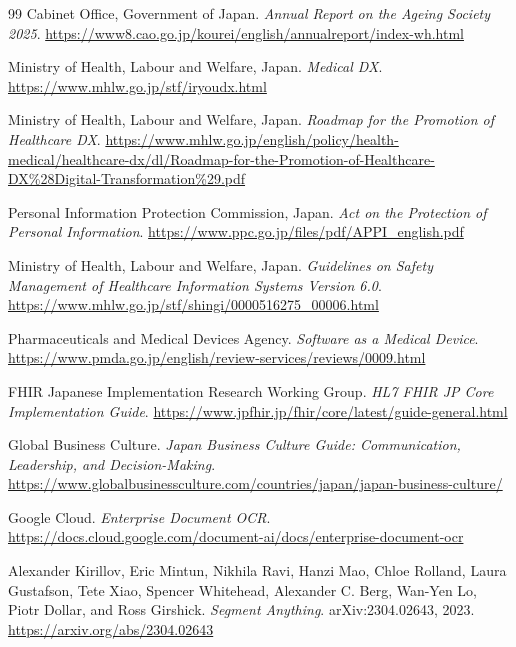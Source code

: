 \begin{thebibliography}{99}
Cabinet Office, Government of Japan.
\newblock \textit{Annual Report on the Ageing Society 2025}.
\newblock \url{https://www8.cao.go.jp/kourei/english/annualreport/index-wh.html}

Ministry of Health, Labour and Welfare, Japan.
\newblock \textit{Medical DX}.
\newblock \url{https://www.mhlw.go.jp/stf/iryoudx.html}

Ministry of Health, Labour and Welfare, Japan.
\newblock \textit{Roadmap for the Promotion of Healthcare DX}.
\newblock \url{https://www.mhlw.go.jp/english/policy/health-medical/healthcare-dx/dl/Roadmap-for-the-Promotion-of-Healthcare-DX%28Digital-Transformation%29.pdf}

Personal Information Protection Commission, Japan.
\newblock \textit{Act on the Protection of Personal Information}.
\newblock \url{https://www.ppc.go.jp/files/pdf/APPI_english.pdf}

Ministry of Health, Labour and Welfare, Japan.
\newblock \textit{Guidelines on Safety Management of Healthcare Information Systems Version 6.0}.
\newblock \url{https://www.mhlw.go.jp/stf/shingi/0000516275_00006.html}

Pharmaceuticals and Medical Devices Agency.
\newblock \textit{Software as a Medical Device}.
\newblock \url{https://www.pmda.go.jp/english/review-services/reviews/0009.html}

FHIR Japanese Implementation Research Working Group.
\newblock \textit{HL7 FHIR JP Core Implementation Guide}.
\newblock \url{https://www.jpfhir.jp/fhir/core/latest/guide-general.html}

Global Business Culture.
\newblock \textit{Japan Business Culture Guide: Communication, Leadership, and Decision-Making}.
\newblock \url{https://www.globalbusinessculture.com/countries/japan/japan-business-culture/}

Google Cloud.
\newblock \textit{Enterprise Document OCR}.
\newblock \url{https://docs.cloud.google.com/document-ai/docs/enterprise-document-ocr}

Alexander Kirillov, Eric Mintun, Nikhila Ravi, Hanzi Mao, Chloe Rolland, Laura Gustafson, Tete Xiao, Spencer Whitehead, Alexander C. Berg, Wan-Yen Lo, Piotr Dollar, and Ross Girshick.
\newblock \textit{Segment Anything}.
\newblock arXiv:2304.02643, 2023.
\newblock \url{https://arxiv.org/abs/2304.02643}


\end{thebibliography}
